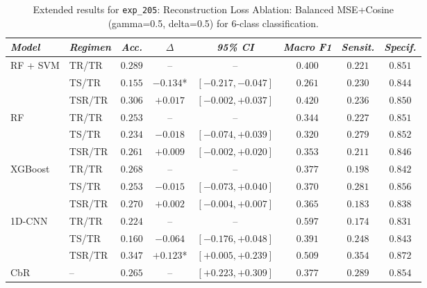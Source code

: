\begin{table}[H]
\centering
\scriptsize
\caption{Extended results for \texttt{exp\_205}: Reconstruction Loss Ablation: Balanced MSE+Cosine (gamma=0.5, delta=0.5) for 6-class classification.}
\label{tab:appendix_exp_205}
\begin{tabular*}{\textwidth}{@{\extracolsep{\fill}}llcccccc}
\toprule
\emph{Model} & \emph{Regimen} & \emph{Acc.} & \emph{$\Delta$} & \emph{95\% CI} & \emph{Macro F1} & \emph{Sensit.} & \emph{Specif.}\\
\midrule
\multirow{3}{*}{RF + SVM} & TR/TR & $0.289$ & -- & -- & $0.400$ & $0.221$ & $0.851$\\
 & TS/TR & $0.155$ & $-0.134$* & $[-0.217, -0.047]$ & $0.261$ & $0.230$ & $0.844$\\
 & TSR/TR & $0.306$ & $+0.017$ & $[-0.002, +0.037]$ & $0.420$ & $0.236$ & $0.850$\\
\midrule
\multirow{3}{*}{RF} & TR/TR & $0.253$ & -- & -- & $0.344$ & $0.227$ & $0.851$\\
 & TS/TR & $0.234$ & $-0.018$ & $[-0.074, +0.039]$ & $0.320$ & $0.279$ & $0.852$\\
 & TSR/TR & $0.261$ & $+0.009$ & $[-0.002, +0.020]$ & $0.353$ & $0.211$ & $0.846$\\
\midrule
\multirow{3}{*}{XGBoost} & TR/TR & $0.268$ & -- & -- & $0.377$ & $0.198$ & $0.842$\\
 & TS/TR & $0.253$ & $-0.015$ & $[-0.073, +0.040]$ & $0.370$ & $0.281$ & $0.856$\\
 & TSR/TR & $0.270$ & $+0.002$ & $[-0.004, +0.007]$ & $0.365$ & $0.183$ & $0.838$\\
\midrule
\multirow{3}{*}{1D-CNN} & TR/TR & $0.224$ & -- & -- & $0.597$ & $0.174$ & $0.831$\\
 & TS/TR & $0.160$ & $-0.064$ & $[-0.176, +0.048]$ & $0.391$ & $0.248$ & $0.843$\\
 & TSR/TR & $0.347$ & $+0.123$* & $[+0.005, +0.239]$ & $0.509$ & $0.354$ & $0.872$\\
\midrule
CbR & -- & $0.265$ & -- & $[+0.223, +0.309]$ & $0.377$ & $0.289$ & $0.854$\\
\bottomrule
\end{tabular*}
\end{table}

